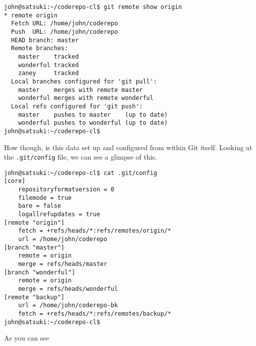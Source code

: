 \begin{Verbatim}
john@satsuki:~/coderepo-cl$ git remote show origin
* remote origin
  Fetch URL: /home/john/coderepo
  Push  URL: /home/john/coderepo
  HEAD branch: master
  Remote branches:
    master    tracked
    wonderful tracked
    zaney     tracked
  Local branches configured for 'git pull':
    master    merges with remote master
    wonderful merges with remote wonderful
  Local refs configured for 'git push':
    master    pushes to master    (up to date)
    wonderful pushes to wonderful (up to date)
john@satsuki:~/coderepo-cl$ 
\end{Verbatim}

How though, is this data set up and configured from within Git itself.  Looking at the \texttt{.git/config} file, we can see a glimpse of this.

\begin{Verbatim}
john@satsuki:~/coderepo-cl$ cat .git/config 
[core]
	repositoryformatversion = 0
	filemode = true
	bare = false
	logallrefupdates = true
[remote "origin"]
	fetch = +refs/heads/*:refs/remotes/origin/*
	url = /home/john/coderepo
[branch "master"]
	remote = origin
	merge = refs/heads/master
[branch "wonderful"]
	remote = origin
	merge = refs/heads/wonderful
[remote "backup"]
	url = /home/john/coderepo-bk
	fetch = +refs/heads/*:refs/remotes/backup/*
john@satsuki:~/coderepo-cl$ 
\end{Verbatim}

As you can see
